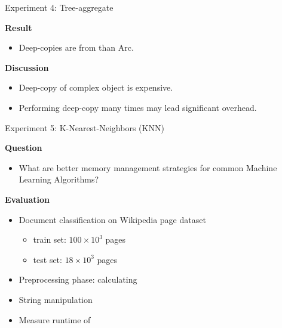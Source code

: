 \documentclass[9pt]{beamer}
\begin{document}

\begin{frame}[fragile]{Experiment 4: Tree-aggregate}

    \textbf{Result}
    \begin{itemize}
        \item Deep-copies are from  than Arc.
    \end{itemize}

    \vspace{0.5cm}

    \textbf{Discussion}
    \begin{itemize}
        \item Deep-copy of complex object is expensive.
        \item Performing deep-copy many times may lead significant overhead.
    \end{itemize}

\end{frame}

\begin{frame}[fragile]{Experiment 5: K-Nearest-Neighbors (KNN)}

    \textbf{Question}
    \begin{itemize}
        \item What are better memory management strategies for common Machine Learning Algorithms?
    \end{itemize}

    \vspace{0.5cm}

    \textbf{Evaluation}
    \begin{itemize}
        \item Document classification on Wikipedia page dataset
        \begin{itemize}
            \item train set: \(100 \times 10^3 \) pages
            \item test set: \(18 \times  10^3\) pages
        \end{itemize}
        \item Preprocessing phase: calculating 
        \item String manipulation
        \item Measure runtime of 
    \end{itemize}
\end{frame}
\end{document}
